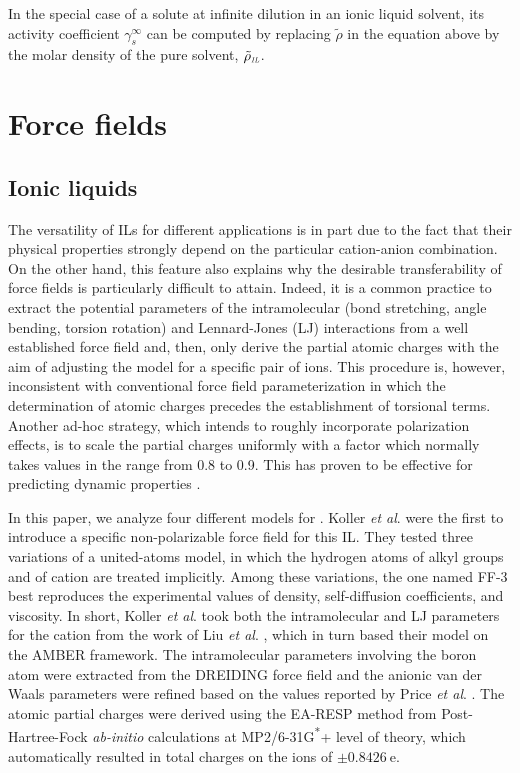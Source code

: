 \documentclass[3p,twocolumn]{elsarticle}
\begin{document}
In the special case of a solute at infinite dilution in an ionic liquid solvent, its activity coefficient $\gamma^\infty_s$ can be computed by replacing $\tilde{\rho}$ in the equation above by the molar density of the pure solvent, $\tilde{\rho}_\textit{\tiny IL}$.

\section{Force fields}
\label{sec:force_field}

\subsection{Ionic liquids}
\label{sec:force_field_il}

The versatility of ILs for different applications is in part due to the fact that their physical properties strongly depend on the particular cation-anion combination.
On the other hand, this feature also explains why the desirable transferability of force fields is particularly difficult to attain.
Indeed, it is a common practice to extract the potential parameters of the intramolecular (bond stretching, angle bending, torsion rotation) and Lennard-Jones (LJ) interactions from a well established force field and, then, only derive the partial atomic charges with the aim of adjusting the model for a specific pair of ions.
This procedure is, however, inconsistent with conventional force field parameterization in which the determination of atomic charges precedes the establishment of torsional terms.
Another ad-hoc strategy, which intends to roughly incorporate polarization effects, is to scale the partial charges uniformly with a factor which normally takes values in the range from 0.8 to 0.9.
This has proven to be effective for predicting dynamic properties \cite{Schr_der_2012}.

In this paper, we analyze four different models for \ce{[emim][B(CN)_4]}.
Koller \textit{et al}. \cite{Koller_2012} were the first to introduce a specific non-polarizable force field for this IL.
They tested three variations of a united-atoms model, in which the hydrogen atoms of alkyl groups  and  of cation \ce{[emim]^+} are treated implicitly.
Among these variations, the one named FF-3 best reproduces the experimental values of density, self-diffusion coefficients, and viscosity.
In short, Koller \textit{et al}. \cite{Koller_2012} took both the intramolecular and LJ parameters for the cation from the work of Liu \textit{et al}. \cite{Liu_2006}, which in turn based their model on the AMBER \cite{Cornell_1995} framework.
The intramolecular parameters involving the boron atom were extracted from the DREIDING \cite{Mayo_1990} force field and the anionic van der Waals parameters were refined based on the values reported by Price \textit{et al}. \cite{Price_2001}.
The atomic partial charges were derived using the EA-RESP method \cite{Basma_2001} from Post-Hartree-Fock \textit{ab-initio} calculations at MP2/6-31G\textsuperscript{*}+ level of theory, which automatically resulted in total charges on the ions of $\pm0.8426~\mathrm{e}$.
\end{document}
